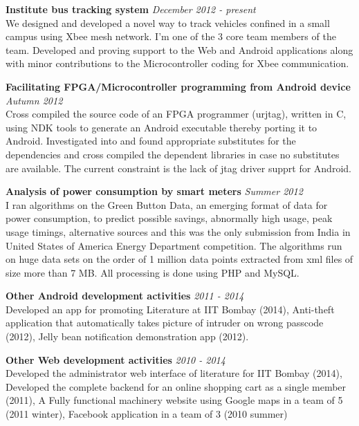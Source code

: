 \documentclass[margin,line]{resume}
\begin{document}
\begin{resume}
    {\bf Institute bus tracking system} \hfill \textit{December 2012 - present} \\
    We designed and developed a novel way to track vehicles confined in a small campus using Xbee mesh network. I'm one of the 3 core team members of the team. Developed and proving support to the Web and Android applications along with minor contributions to the Microcontroller coding for Xbee communication.
    	
    {\bf Facilitating FPGA/Microcontroller programming from Android device} \hfill \textit{Autumn 2012} \\
     Cross compiled the source code of an FPGA programmer (urjtag), written in C, using NDK tools to generate an Android executable thereby porting it to Android. Investigated into and found appropriate substitutes for the dependencies and cross compiled the dependent libraries in case no substitutes are available. The current constraint is the lack of jtag driver supprt for Android.
    	
    {\bf Analysis of power consumption by smart meters} \hfill \textit{Summer 2012} \\
     I ran algorithms on the Green Button Data, an emerging format of data for power consumption, to predict possible savings, abnormally high usage, peak usage timings, alternative sources and this was the only submission from India in United States of America Energy Department competition. The algorithms run on huge data sets on the order of 1 million data points extracted from xml files of size more than 7 MB. All processing is done using PHP and MySQL.
    	
    {\bf Other Android development activities} \hfill \textit{2011 - 2014} \\
    Developed an app for promoting Literature at IIT Bombay (2014), Anti-theft application that automatically takes picture of intruder on wrong passcode (2012), Jelly bean notification demonstration app (2012).
    	
    {\bf Other Web development activities} \hfill \textit{2010 - 2014} \\
    Developed the administrator web interface of literature for IIT Bombay (2014), Developed the complete backend for an online shopping cart as a single member (2011), A Fully functional machinery website using Google maps in a team of 5 (2011 winter), Facebook application in a team of 3 (2010 summer)
    

\end{resume}
\end{document}
